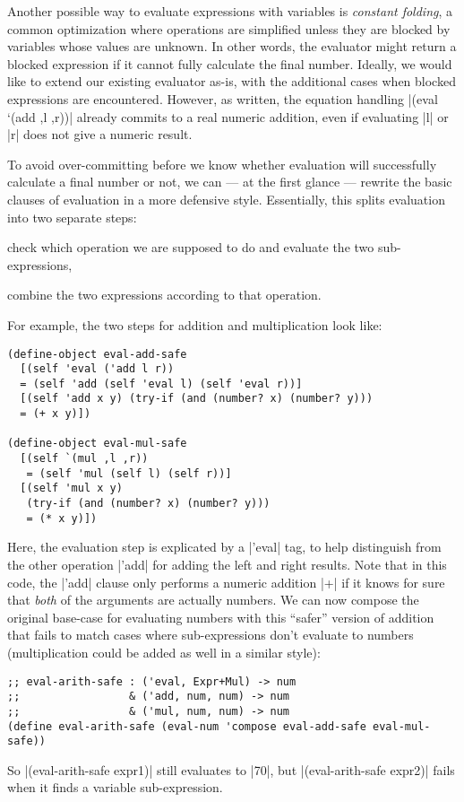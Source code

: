 Another possible way to evaluate expressions with variables is \emph{constant folding}, a common optimization where operations are simplified unless they are blocked by variables whose values are unknown.
In other words, the evaluator might return a blocked expression if it cannot fully calculate the final number.
Ideally, we would like to extend our existing evaluator as-is, with the additional cases when blocked expressions are encountered.  
However, as written, the equation handling \scm|(eval `(add ,l ,r))| already commits to a real numeric addition, even if evaluating \scm|l| or \scm|r| does not give a numeric result.

To avoid over-committing before we know whether evaluation will successfully calculate a final number or not, we can --- at the first glance --- rewrite the basic clauses of evaluation in a more defensive style.
Essentially, this splits evaluation into two separate steps:
\begin{enumerate*}[(1)]
\item check which operation we are supposed to do and evaluate the two sub-expressions,
\item combine the two expressions according to that operation.
\end{enumerate*}
For example, the two steps for addition and multiplication look like:
\begin{verbatim} 
(define-object eval-add-safe
  [(self 'eval ('add l r))
  = (self 'add (self 'eval l) (self 'eval r))]
  [(self 'add x y) (try-if (and (number? x) (number? y)))
  = (+ x y)])

(define-object eval-mul-safe
  [(self `(mul ,l ,r))
   = (self 'mul (self l) (self r))]
  [(self 'mul x y)
   (try-if (and (number? x) (number? y)))
   = (* x y)])
\end{verbatim}
Here, the evaluation step is explicated by a \scm|'eval| tag, to help distinguish from the other operation \scm|'add| for adding the left and right results.
Note that in this code, the \scm|'add| clause only performs a numeric addition \scm|+| if it knows for sure that \emph{both} of the arguments are actually numbers.
We can now compose the original base-case for evaluating numbers with this ``safer'' version of addition that fails to match cases where sub-expressions don't evaluate to numbers (multiplication could be added as well in a similar style):
\begin{verbatim}
;; eval-arith-safe : ('eval, Expr+Mul) -> num
;;                 & ('add, num, num) -> num
;;                 & ('mul, num, num) -> num
(define eval-arith-safe (eval-num 'compose eval-add-safe eval-mul-safe))
\end{verbatim}
So \scm|(eval-arith-safe expr1)| still evaluates to \scm|70|, but \scm|(eval-arith-safe expr2)| fails when it finds a variable sub-expression.

